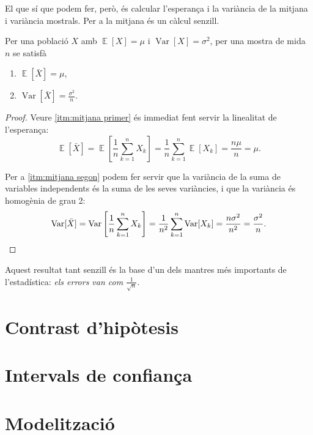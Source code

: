 \documentclass[12pt,twoside]{report}
\numberwithin{table}{section}
\numberwithin{equation}{section}
\numberwithin{figure}{section}
\DeclareMathOperator{\E}{\mathbb{E}}
\DeclareMathOperator{\Var}{Var}
\begin{document}
El que sí que podem fer, però, és calcular l'esperança i la variància de la mitjana i variància mostrals. Per a la mitjana és un càlcul senzill. 

\begin{prop}
	Per una població \( X \) amb \( \E[X] = \mu \) i \( \Var[X] = \sigma^2 \), per una mostra de mida \( n \) se satisfà
	\begin{enumerate}[label=\textup{(}{\itshape \roman*}\textup{)}]
		\item\label{itm:mitjana primer} \( \E[\bar{X}] = \mu \),
		\item\label{itm:mitjana segon} \( \Var[\bar{X}] = \frac{\sigma^2}{n} \).
	\end{enumerate}
\end{prop}

\begin{proof}
	Veure \ref{itm:mitjana primer} és immediat fent servir la linealitat de l'esperança:
	\begin{equation*}
		\E[\bar{X}] = \E\left[ \frac{1}{n} \sum_{k = 1}^n X_k \right] = \frac{1}{n} \sum_{k = 1}^n \E[X_k] = \frac{n\mu}{n} = \mu.
	\end{equation*}

	Per a \ref{itm:mitjana segon} podem fer servir que la variància de la suma de variables independents és la suma de les seves variàncies, i que la variància és homogènia de grau 2:
	\begin{equation*}
		\Var[\bar{X}] = \Var\left[ \frac{1}{n} \sum_{k = 1}^n X_k \right] = \frac{1}{n^2} \sum_{k = 1}^n \Var[X_k] = \frac{n\sigma^2}{n^2} = \frac{\sigma^2}{n}. \qedhere
	\end{equation*}
\end{proof}

Aquest resultat tant senzill és la base d'un dels mantres més importants de l'estadística: \emph{els errors van com \( \frac{1}{\sqrt{n}} \)}.

\chapter{Contrast d'hipòtesis}

\chapter{Intervals de confiança}

\chapter{Modelització}
\end{document}
